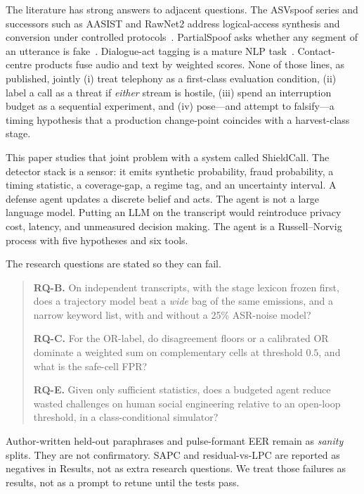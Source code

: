 \documentclass[11pt]{article}
\begin{document}
The literature has strong answers to adjacent questions. The ASVspoof series and successors such as AASIST and RawNet2 address logical-access synthesis and conversion under controlled protocols~\cite{todisco2019asvspoof,wang2020asvspoof,jung2022aasist,tak2021end}. PartialSpoof asks whether any segment of an utterance is fake~\cite{zhang2021partial,zhang2023partialspoof}. Dialogue-act tagging is a mature NLP task~\cite{stolcke2000dialogue}. Contact-centre products fuse audio and text by weighted scores. None of those lines, as published, jointly (i) treat telephony as a first-class evaluation condition, (ii) label a call as a threat if \emph{either} stream is hostile, (iii) spend an interruption budget as a sequential experiment, and (iv) pose---and attempt to falsify---a timing hypothesis that a production change-point coincides with a harvest-class stage.

This paper studies that joint problem with a system called ShieldCall. The detector stack is a sensor: it emits synthetic probability, fraud probability, a timing statistic, a coverage-gap, a regime tag, and an uncertainty interval. A defense agent updates a discrete belief and acts. The agent is not a large language model. Putting an LLM on the transcript would reintroduce privacy cost, latency, and unmeasured decision making. The agent is a Russell--Norvig process with five hypotheses and six tools.

The research questions are stated so they can fail.

\begin{quote}
\textbf{RQ-B.} On independent transcripts, with the stage lexicon frozen first, does a trajectory model beat a \emph{wide} bag of the same emissions, and a narrow keyword list, with and without a 25\% ASR-noise model?

\textbf{RQ-C.} For the OR-label, do disagreement floors or a calibrated OR dominate a weighted sum on complementary cells at threshold $0.5$, and what is the safe-cell FPR?

\textbf{RQ-E.} Given only sufficient statistics, does a budgeted agent reduce wasted challenges on human social engineering relative to an open-loop threshold, in a class-conditional simulator?
\end{quote}

Author-written held-out paraphrases and pulse-formant EER remain as \emph{sanity} splits. They are not confirmatory. SAPC and residual-vs-LPC are reported as negatives in Results, not as extra research questions. We treat those failures as results, not as a prompt to retune until the tests pass.
\end{document}
